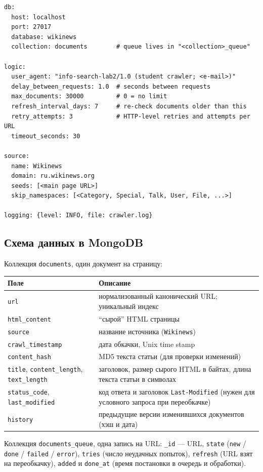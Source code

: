 \begin{lstlisting}
db:
  host: localhost
  port: 27017
  database: wikinews
  collection: documents        # queue lives in "<collection>_queue"

logic:
  user_agent: "info-search-lab2/1.0 (student crawler; <e-mail>)"
  delay_between_requests: 1.0  # seconds between requests
  max_documents: 30000         # 0 = no limit
  refresh_interval_days: 7     # re-check documents older than this
  retry_attempts: 3            # HTTP-level retries and attempts per URL
  timeout_seconds: 30

source:
  name: Wikinews
  domain: ru.wikinews.org
  seeds: [<main page URL>]
  skip_namespaces: [<Category, Special, Talk, User, File, ...>]

logging: {level: INFO, file: crawler.log}
\end{lstlisting}

\subsection{Схема данных в MongoDB}
Коллекция \texttt{documents}, один документ на страницу:

\begin{tabular}{|p{4.6cm}|p{10.2cm}|}
\hline
Поле & Описание \\ \hline
\texttt{url} & нормализованный канонический URL; уникальный индекс \\ \hline
\texttt{html\_content} & \enquote{сырой} HTML страницы \\ \hline
\texttt{source} & название источника (\texttt{Wikinews}) \\ \hline
\texttt{crawl\_timestamp} & дата обкачки, Unix time stamp \\ \hline
\texttt{content\_hash} & MD5 текста статьи (для проверки изменений) \\ \hline
\texttt{title}, \texttt{content\_length}, \texttt{text\_length} & заголовок,
размер сырого HTML в байтах, длина текста статьи в символах \\ \hline
\texttt{status\_code}, \texttt{last\_modified} & код ответа и заголовок
\texttt{Last-Modified} (нужен для условного запроса при переобкачке) \\ \hline
\texttt{history} & предыдущие версии изменившихся документов (хэш и дата) \\ \hline
\end{tabular}

Коллекция \texttt{documents\_queue}, одна запись на URL: \texttt{\_id} --- URL,
\texttt{state} (\texttt{new} / \texttt{done} / \texttt{failed} / \texttt{error}),
\texttt{tries} (число неудачных попыток), \texttt{refresh} (URL взят на
переобкачку), \texttt{added} и \texttt{done\_at} (время постановки в очередь и
обработки).

